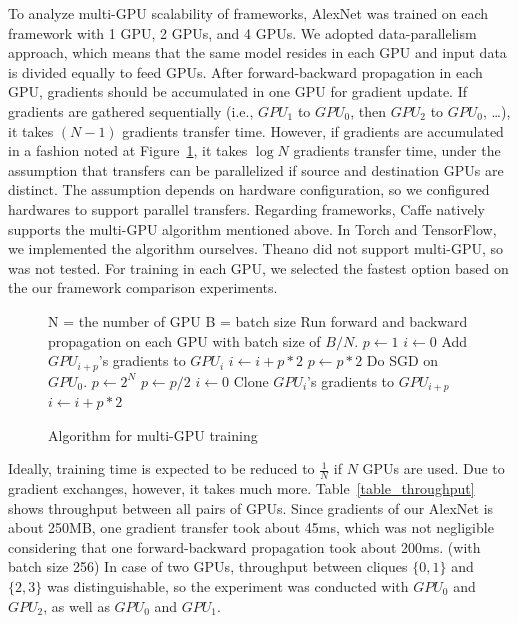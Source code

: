 To analyze multi-GPU scalability of frameworks, AlexNet was trained on each framework with 1 GPU, 2 GPUs, and 4 GPUs\@.
We adopted data-parallelism approach, which means that the same model resides in each GPU and input data is divided equally to feed GPUs.
After forward-backward propagation in each GPU, gradients should be accumulated in one GPU for gradient update.
If gradients are gathered sequentially (i.e., $GPU_1$ to $GPU_0$, then $GPU_2$ to $GPU_0$, \ldots), it takes $(N-1)$ gradients transfer time.
However, if gradients are accumulated in a fashion noted at Figure~\ref{fig_multigpu_algorithm}, it takes $\log{N}$ gradients transfer time, under the assumption that transfers can be parallelized if source and destination GPUs are distinct.
The assumption depends on hardware configuration, so we configured hardwares to support parallel transfers.
Regarding frameworks, Caffe natively supports the multi-GPU algorithm mentioned above.
In Torch and TensorFlow, we implemented the algorithm ourselves.
Theano did not support multi-GPU, so was not tested.
For training in each GPU, we selected the fastest option based on the our framework comparison experiments.

\begin{figure}
\begin{algorithmic}[1]
  \REQUIRE N = the number of GPU
  \REQUIRE B = batch size
  \STATE Run forward and backward propagation on each GPU with batch size of $B/N$.
  \STATE $p\gets 1$
    \STATE $i\gets 0$
      \STATE Add $GPU_{i+p}$'s gradients to $GPU_{i}$
      \STATE $i\gets i+p*2$
    \ENDWHILE
    \STATE $p\gets p*2$
  \ENDWHILE
  \STATE Do SGD on $GPU_{0}$.
  \STATE $p\gets 2^{N}$
    \STATE $p\gets p/2$
    \STATE $i\gets 0$
      \STATE Clone $GPU_{i}$'s gradients to $GPU_{i+p}$
      \STATE $i\gets i+p*2$
    \ENDWHILE
  \ENDWHILE
\end{algorithmic}
\caption{Algorithm for multi-GPU training\label{fig_multigpu_algorithm}}
\end{figure}

Ideally, training time is expected to be reduced to $\frac{1}{N}$ if $N$ GPUs are used.
Due to gradient exchanges, however, it takes much more.
Table~\ref{table_throughput} shows throughput between all pairs of GPUs.
Since gradients of our AlexNet is about 250MB, one gradient transfer took about 45ms, which was not negligible considering that one forward-backward propagation took about 200ms. (with batch size 256)
In case of two GPUs, throughput between cliques $\{0, 1\}$ and $\{2, 3\}$ was distinguishable, so the experiment was conducted with $GPU_0$ and $GPU_2$, as well as $GPU_0$ and $GPU_1$.

